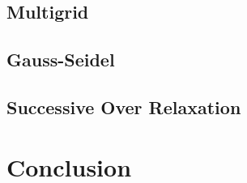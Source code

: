 \documentclass[pdftex,12pt,a4paper]{article}
\begin{document}
    \subsection{Multigrid}   
        \paragraph*{}

    \subsection{Gauss-Seidel}
        \paragraph*{}

    \subsection{Successive Over Relaxation}
        \paragraph*{}

\section{Conclusion}



















\end{document}
